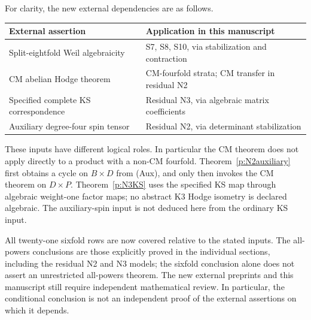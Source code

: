 \documentclass[10pt,reqno]{article}
\theoremstyle{emphasizedplain}
\theoremstyle{emphasizeddefinition}
\theoremstyle{emphasizeddefinition}
\begin{document}
For clarity, the new external dependencies are as follows.
\begin{center}
\begin{tabular}{>{\raggedright\arraybackslash}p{}
                >{\raggedright\arraybackslash}p{}}
\toprule
External assertion & Application in this manuscript\\
\midrule
Split-eightfold Weil algebraicity \cite{OpenAIEightfold}
 & S7, S8, S10, via stabilization and contraction\\
CM abelian Hodge theorem \cite{OpenAICM}
 & CM-fourfold strata; CM transfer in residual N2\\
Specified complete KS correspondence \cite{OpenAIKS}
 & Residual N3, via algebraic matrix coefficients\\
Auxiliary degree-four spin tensor \cite{OpenAIK3Products}
 & Residual N2, via determinant stabilization\\
\bottomrule
\end{tabular}
\end{center}

These inputs have different logical roles. In particular the CM
theorem does not apply directly to a product with a non-CM fourfold.
Theorem~\ref{p:N2auxiliary} first obtains a cycle on $B\times D$
from (Aux), and only then invokes the CM theorem on $D\times P$.
Theorem~\ref{p:N3KS} uses the specified KS map through algebraic
weight-one factor maps; no abstract K3 Hodge isometry is declared
algebraic. The auxiliary-spin input is not deduced here from the
ordinary KS input.

All twenty-one sixfold rows are now covered relative to the stated
inputs. The all-powers conclusions are those explicitly proved in
the individual sections, including the residual N2 and N3 models;
the sixfold conclusion alone does not assert an unrestricted
all-powers theorem. The new external preprints and this manuscript
still require independent mathematical review. In particular,
the conditional conclusion is not an independent proof of the
external assertions on which it depends.
\end{document}
